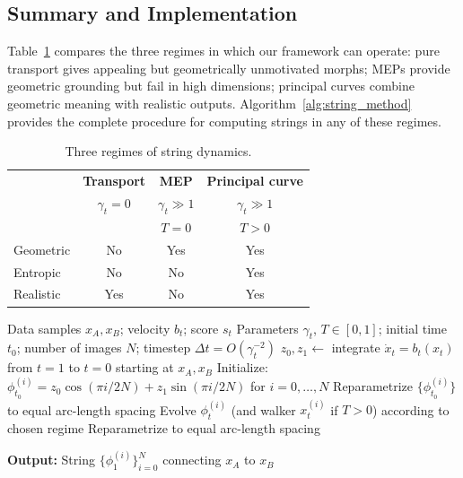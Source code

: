 \documentclass{article}
\theoremstyle{plain}
\theoremstyle{definition}
\theoremstyle{remark}
\begin{document}
\subsection{Summary and Implementation}
\label{sec:algorithm}

Table~\ref{tab:regimes} compares the three regimes in which our framework can operate: pure transport gives appealing but geometrically unmotivated morphs; MEPs provide geometric grounding but fail in high dimensions; principal curves combine geometric meaning with realistic outputs. Algorithm~\ref{alg:string_method} provides the complete procedure for computing strings in any of these regimes.

\begin{table}
\caption{Three regimes of string dynamics.}
\label{tab:regimes}
\centering
\small
\begin{tabular}{@{}lccc@{}}
\toprule
& \textbf{Transport} & \textbf{MEP} & \textbf{Principal curve} \\
& $\gamma_t = 0$ & $\gamma_t \gg1$ & $\gamma_t \gg1$ \\
&  & $T=0$ & $T > 0$ \\
\midrule
Geometric & No & Yes & Yes \\
Entropic & No & No & Yes \\
Realistic & Yes & No & Yes \\
\bottomrule
\end{tabular}
\end{table}

\begin{algorithm}
\caption{Diffusion String Method}
\label{alg:string_method}
\begin{algorithmic}[1]
\REQUIRE Data samples $x_A, x_B$; velocity $b_t$; score $s_t$
\REQUIRE Parameters $\gamma_t$, $T \in [0,1]$; initial time $t_0$; number of images $N$; timestep $\Delta t = O(\gamma_t^{-2})$
\STATE $z_0, z_1 \gets$ integrate $\dot{x}_t = b_t(x_t)$ from $t=1$ to $t=0$ starting at $x_A, x_B$
\STATE Initialize: $\phi_{t_0}^{(i)} = z_0 \cos(\pi i / 2N) + z_1 \sin(\pi i / 2N)$ for $i = 0, \ldots, N$
\STATE Reparametrize $\{\phi_{t_0}^{(i)}\}$ to equal arc-length spacing
        \STATE Evolve $\phi_t^{(i)}$ (and walker $x_t^{(i)}$ if $T > 0$) according to chosen regime
    \ENDFOR
    \STATE Reparametrize to equal arc-length spacing
\ENDWHILE
\end{algorithmic}
\textbf{Output:} String $\{\phi_1^{(i)}\}_{i=0}^N$ connecting $x_A$ to $x_B$
\end{algorithm}
\end{document}
